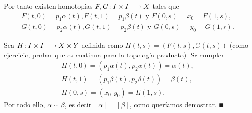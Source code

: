 \documentclass[GTS.tex]{subfiles}
\begin{document}
\begin{dem}
\begin{itemize}
Por tanto existen homotopías $F,G\colon{I\times I}\longrightarrow{X}$ tales que
\begin{gather*}
F(t,0)=p_1\alpha(t), F(t,1)=p_1\beta(t) \mbox{ y } F(0,s)=x_0=F(1,s),\\
G(t,0)=p_2\alpha(t), G(t,1)=p_2\beta(t) \mbox{ y } G(0,s)=y_0=G(1,s).
\end{gather*}




Sea $H\colon{I\times I}\longrightarrow{X\times Y}$ definida como $H(t,s)=(F(t,s),G(t,s))$ (como ejercicio, probar que es continua para la topología producto). Se cumplen
\begin{gather*}
H(t,0)=(p_1\alpha(t),p_2\alpha(t))=\alpha(t),\\
H(t,1)=(p_1\beta(t),p_2\beta(t))=\beta(t),\\
H(0,s)=(x_0,y_0)=H(1,s).
\end{gather*}
Por todo ello, $\alpha\sim\beta$, es decir $[\alpha]=[\beta]$, como queríamos demostrar. $\QED$
\end{itemize}
\end{dem}
\end{document}
